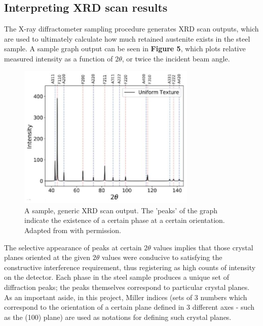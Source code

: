 \documentclass[10pt]{article}
\begin{document}
\subsection{Interpreting XRD scan results}
The X-ray diffractometer sampling procedure generates XRD scan outputs, which are used to ultimately calculate how much retained austenite 
exists in the steel sample. A sample graph output can be seen in \textbf{Figure 5}, which plots relative measured intensity as a function of
$2\theta$, or twice the incident beam angle.

\begin{figure}[h]
    \centering
    \includegraphics[width=8.5cm]{fig5}
    \caption{\label{tab1}A sample, generic XRD scan output. The 'peaks' of the graph indicate the existence of a
    certain phase at a certain orientation. Adapted from \cite{ref06} with permission.} 
    \end{figure}

The selective appearance of peaks at certain $2\theta$ values implies that those crystal planes oriented at the given $2\theta$ values were conducive to satisfying the 
constructive interference requirement, thus registering as high counts of intensity on the detector. Each phase in the steel sample
produces a unique set of diffraction peaks; the peaks themselves correspond to particular crystal planes. As an important aside, in this project,
Miller indices (sets of 3 numbers which correspond to the orientation of a certain plane defined in 3 different axes - such as the (100) plane) are used as notations for defining
such crystal planes.
\end{document}
